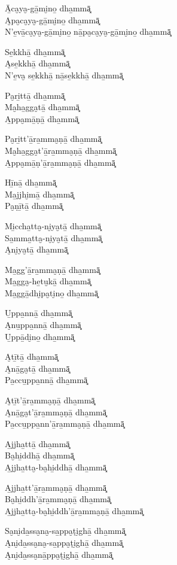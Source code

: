 \begin{paritta}
Ā̱ca̮ya̮-gā̱mi̮no̱ dha̱mmā͓\\
A̮pa̮ca̮ya̮-gā̱mi̮no̱ dha̱mmā͓\\
N'e̱vā̱ca̮ya̮-gā̱mi̮no̱ nā̱pa̮ca̮ya̮-gā̱mi̮no̱ dha̱mmā͓

Se̱kkhā̱ dha̱mmā͓\\
A̮se̱kkhā̱ dha̱mmā͓\\
N'e̱va̮ se̱kkhā̱ nā̱se̱kkhā̱ dha̱mmā͓

Pa̮ri̱ttā̱ dha̱mmā͓\\
Ma̮ha̱gga̮tā̱ dha̱mmā͓\\
A̱ppa̮mā̱ṇā̱ dha̱mmā͓

Pa̮ri̱tt'ā̱ra̱mma̮ṇā̱ dha̱mmā͓\\
Ma̮ha̱gga̮t'ā̱ra̱mma̮ṇā̱ dha̱mmā͓\\
A̱ppa̮mā̱ṇ'ā̱ra̱mma̮ṇā̱ dha̱mmā͓

Hī̱nā̱ dha̱mmā͓\\
Ma̱jjhi̮mā̱ dha̱mmā͓\\
Pa̮ṇī̱tā̱ dha̱mmā͓

Mi̱ccha̱tta̮-ni̮ya̮tā̱ dha̱mmā͓\\
Sa̱mma̱tta̮-ni̮ya̮tā̱ dha̱mmā͓\\
A̮ni̮ya̮tā̱ dha̱mmā͓

Ma̱gg'ā̱ra̱mma̮ṇā̱ dha̱mmā͓\\
Ma̱gga̮-he̱tu̮kā̱ dha̱mmā͓\\
Ma̱ggā̱dhi̮pa̮ti̮no̱ dha̱mmā͓

\clearpage

U̱ppa̱nnā̱ dha̱mmā͓\\
A̮nu̱ppa̱nnā̱ dha̱mmā͓\\
U̱ppā̱di̮no̱ dha̱mmā͓

A̮tī̱tā̱ dha̱mmā͓\\
A̮nā̱ga̮tā̱ dha̱mmā͓\\
Pa̱ccu̱ppa̱nnā̱ dha̱mmā͓

A̮tī̱t'ā̱ra̱mma̮ṇā̱ dha̱mmā͓\\
A̮nā̱ga̮t'ā̱ra̱mma̮ṇā̱ dha̱mmā͓\\
Pa̱ccu̱ppa̱nn'ā̱ra̱mma̮ṇā̱ dha̱mmā͓

A̱jjha̱ttā̱ dha̱mmā͓\\
Ba̮hi̱ddhā̱ dha̱mmā͓\\
A̱jjha̱tta̮-ba̮hi̱ddhā̱ dha̱mmā͓

A̱jjha̱tt'ā̱ra̱mma̮ṇā̱ dha̱mmā͓\\
Ba̮hi̱ddh'ā̱ra̱mma̮ṇā̱ dha̱mmā͓\\
A̱jjha̱tta̮-ba̮hi̱ddh'ā̱ra̱mma̮ṇā̱ dha̱mmā͓

Sa̮ni̮da̱ssa̮na̮-sa̱ppa̮ṭi̮ghā̱ dha̱mmā͓\\
A̮ni̮da̱ssa̮na̮-sa̱ppa̮ṭi̮ghā̱ dha̱mmā͓\\
A̮ni̮da̱ssa̮nā̱ppa̮ṭi̮ghā̱ dha̱mmā͓
\end{paritta}

